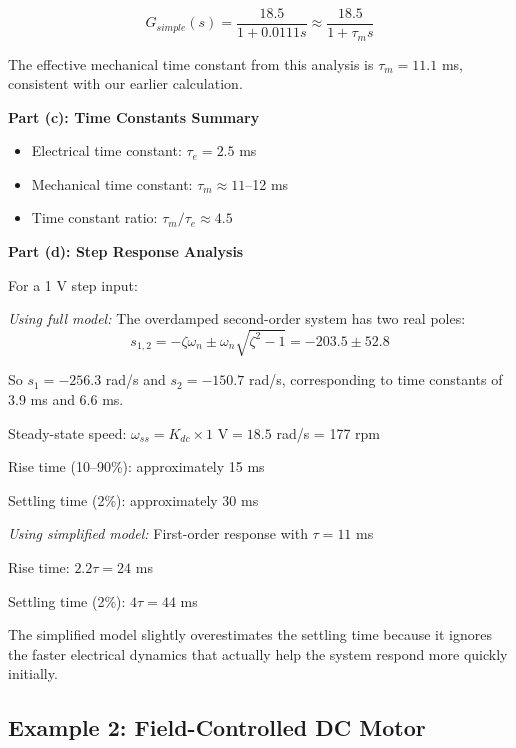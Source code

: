 \begin{equation}
    \boxed{G_{simple}(s) = \frac{18.5}{1 + 0.0111 s} \approx \frac{18.5}{1 + \tau_m s}}
\end{equation}

The effective mechanical time constant from this analysis is $\tau_m = 11.1$ ms, consistent with our earlier calculation.

\textbf{Part (c): Time Constants Summary}
\begin{itemize}
    \item Electrical time constant: $\tau_e = 2.5$ ms
    \item Mechanical time constant: $\tau_m \approx 11$--12 ms
    \item Time constant ratio: $\tau_m / \tau_e \approx 4.5$
\end{itemize}

\textbf{Part (d): Step Response Analysis}

For a 1 V step input:

\textit{Using full model:} The overdamped second-order system has two real poles:
\begin{equation}
    s_{1,2} = -\zeta\omega_n \pm \omega_n\sqrt{\zeta^2 - 1} = -203.5 \pm 52.8
\end{equation}

So $s_1 = -256.3$ rad/s and $s_2 = -150.7$ rad/s, corresponding to time constants of 3.9 ms and 6.6 ms.

Steady-state speed: $\omega_{ss} = K_{dc} \times 1 \text{ V} = 18.5$ rad/s = 177 rpm

Rise time (10--90\%): approximately 15 ms

Settling time (2\%): approximately 30 ms

\textit{Using simplified model:} First-order response with $\tau = 11$ ms

Rise time: $2.2 \tau = 24$ ms

Settling time (2\%): $4\tau = 44$ ms

The simplified model slightly overestimates the settling time because it ignores the faster electrical dynamics that actually help the system respond more quickly initially.

\subsection{Example 2: Field-Controlled DC Motor}

